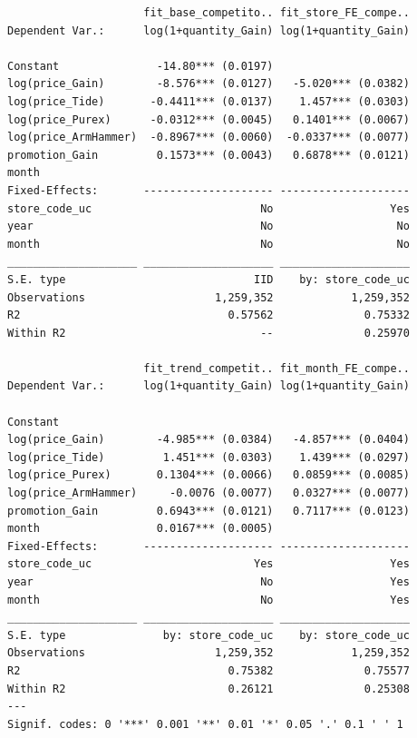 \documentclass[
]{article}
\begin{document}
\begin{verbatim}
                     fit_base_competito.. fit_store_FE_compe..
Dependent Var.:      log(1+quantity_Gain) log(1+quantity_Gain)
                                                              
Constant               -14.80*** (0.0197)                     
log(price_Gain)        -8.576*** (0.0127)   -5.020*** (0.0382)
log(price_Tide)       -0.4411*** (0.0137)    1.457*** (0.0303)
log(price_Purex)      -0.0312*** (0.0045)   0.1401*** (0.0067)
log(price_ArmHammer)  -0.8967*** (0.0060)  -0.0337*** (0.0077)
promotion_Gain         0.1573*** (0.0043)   0.6878*** (0.0121)
month                                                         
Fixed-Effects:       -------------------- --------------------
store_code_uc                          No                  Yes
year                                   No                   No
month                                  No                   No
____________________ ____________________ ____________________
S.E. type                             IID    by: store_code_uc
Observations                    1,259,352            1,259,352
R2                                0.57562              0.75332
Within R2                              --              0.25970

                     fit_trend_competit.. fit_month_FE_compe..
Dependent Var.:      log(1+quantity_Gain) log(1+quantity_Gain)
                                                              
Constant                                                      
log(price_Gain)        -4.985*** (0.0384)   -4.857*** (0.0404)
log(price_Tide)         1.451*** (0.0303)    1.439*** (0.0297)
log(price_Purex)       0.1304*** (0.0066)   0.0859*** (0.0085)
log(price_ArmHammer)     -0.0076 (0.0077)   0.0327*** (0.0077)
promotion_Gain         0.6943*** (0.0121)   0.7117*** (0.0123)
month                  0.0167*** (0.0005)                     
Fixed-Effects:       -------------------- --------------------
store_code_uc                         Yes                  Yes
year                                   No                  Yes
month                                  No                  Yes
____________________ ____________________ ____________________
S.E. type               by: store_code_uc    by: store_code_uc
Observations                    1,259,352            1,259,352
R2                                0.75382              0.75577
Within R2                         0.26121              0.25308
---
Signif. codes: 0 '***' 0.001 '**' 0.01 '*' 0.05 '.' 0.1 ' ' 1
\end{verbatim}
\end{document}
